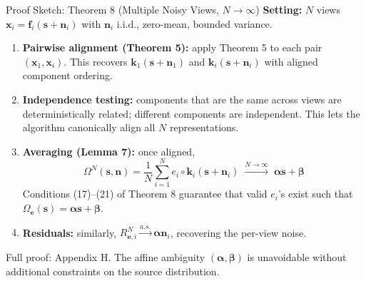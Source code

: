 \documentclass[aspectratio=169, 10pt]{beamer}
\begin{document}
\begin{frame}{Proof Sketch: Theorem 8 (Multiple Noisy Views, $N\to\infty$)}
  \textbf{Setting:} $N$ views $\mathbf{x}_i=\mathbf{f}_i(\mathbf{s}+\mathbf{n}_i)$
  with $\mathbf{n}_i$ i.i.d., zero-mean, bounded variance.

  \medskip
  \begin{enumerate}
    \item \textbf{Pairwise alignment (Theorem 5):} apply Theorem 5 to each pair
          $(\mathbf{x}_1,\mathbf{x}_i)$. This recovers $\mathbf{k}_1(\mathbf{s}+\mathbf{n}_1)$
          and $\mathbf{k}_i(\mathbf{s}+\mathbf{n}_i)$ with aligned component ordering.
    \item \textbf{Independence testing:} components that are the same across views are
          deterministically related; different components are independent. This lets the
          algorithm canonically align all $N$ representations.
    \item \textbf{Averaging (Lemma 7):} once aligned,
          \[
            \Omega^N(\mathbf{s},\mathbf{n})
            = \frac{1}{N}\sum_{i=1}^N e_i\circ\mathbf{k}_i(\mathbf{s}+\mathbf{n}_i)
            \;\xrightarrow{N\to\infty}\; \boldsymbol{\alpha}\mathbf{s}+\boldsymbol{\beta}
          \]
          Conditions (17)--(21) of Theorem 8 guarantee that valid $e_i$'s exist such that
          $\Omega_{\mathbf{e}}(\mathbf{s})=\boldsymbol{\alpha}\mathbf{s}+\boldsymbol{\beta}$.
    \item \textbf{Residuals:} similarly, $R^N_{\mathbf{e},i}\xrightarrow{a.s.}
          \boldsymbol{\alpha}\mathbf{n}_i$, recovering the per-view noise.
  \end{enumerate}

  \medskip
  Full proof: Appendix H. The affine ambiguity $(\boldsymbol{\alpha},\boldsymbol{\beta})$
  is unavoidable without additional constraints on the source distribution.
\end{frame}

\end{document}
